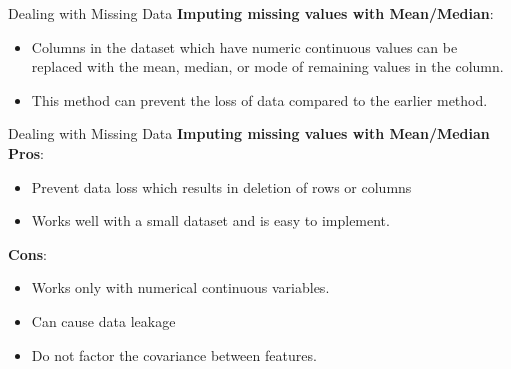 \documentclass[11pt]{beamer}
\begin{document}
%
%
\begin{frame}{Dealing with Missing Data}
\textbf{Imputing missing values with Mean/Median}:
\begin{itemize}
\item Columns in the dataset which have numeric continuous values can be replaced with the mean, median, or mode of remaining values in the column. 
\item This method can prevent the loss of data compared to the earlier method. 
\end{itemize}
\end{frame}
%
%
\begin{frame}{Dealing with Missing Data}
\textbf{Imputing missing values with Mean/Median}\\
\vspace{0.5cm}
\textbf{Pros}:
\begin{itemize}
\item Prevent data loss which results in deletion of rows or columns
\item Works well with a small dataset and is easy to implement.
\end{itemize}
\textbf{Cons}:
\begin{itemize}
\item Works only with numerical continuous variables.
\item Can cause data leakage
\item Do not factor the covariance between features.
\end{itemize}
\end{frame}
%
%
\end{document}
